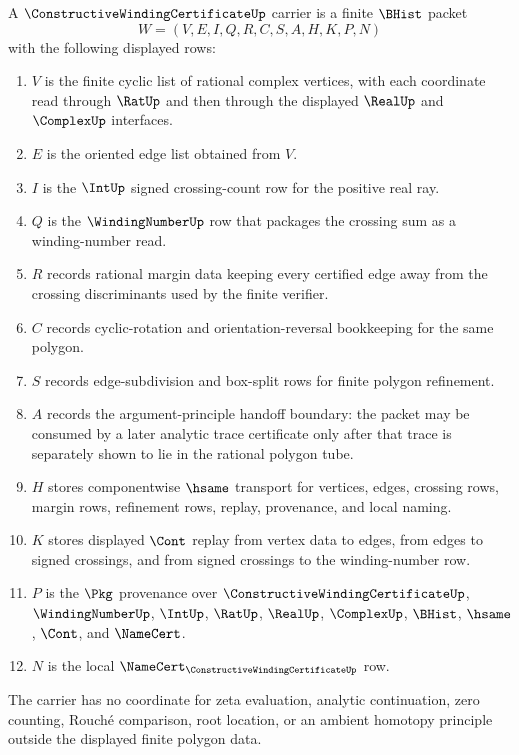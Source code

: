 \begin{definition}
\label{def:constructive-winding-certificate-carrier}
A $\ConstructiveWindingCertificateUp$ carrier is a finite $\BHist$ packet
$$
W=(V,E,I,Q,R,C,S,A,H,K,P,N)
$$
with the following displayed rows:
\begin{enumerate}
\item $V$ is the finite cyclic list of rational complex vertices, with each coordinate read through $\RatUp$ and then through the displayed $\RealUp$ and $\ComplexUp$ interfaces.
\item $E$ is the oriented edge list obtained from $V$.
\item $I$ is the $\IntUp$ signed crossing-count row for the positive real ray.
\item $Q$ is the $\WindingNumberUp$ row that packages the crossing sum as a winding-number read.
\item $R$ records rational margin data keeping every certified edge away from the crossing discriminants used by the finite verifier.
\item $C$ records cyclic-rotation and orientation-reversal bookkeeping for the same polygon.
\item $S$ records edge-subdivision and box-split rows for finite polygon refinement.
\item $A$ records the argument-principle handoff boundary: the packet may be consumed by a later analytic trace certificate only after that trace is separately shown to lie in the rational polygon tube.
\item $H$ stores componentwise $\hsame$ transport for vertices, edges, crossing rows, margin rows, refinement rows, replay, provenance, and local naming.
\item $K$ stores displayed $\Cont$ replay from vertex data to edges, from edges to signed crossings, and from signed crossings to the winding-number row.
\item $P$ is the $\Pkg$ provenance over $\ConstructiveWindingCertificateUp$, $\WindingNumberUp$, $\IntUp$, $\RatUp$, $\RealUp$, $\ComplexUp$, $\BHist$, $\hsame$, $\Cont$, and $\NameCert$.
\item $N$ is the local $\NameCert_{\ConstructiveWindingCertificateUp}$ row.
\end{enumerate}
The carrier has no coordinate for zeta evaluation, analytic continuation, zero counting, Rouch\'e comparison, root location, or an ambient homotopy principle outside the displayed finite polygon data.
\end{definition}

